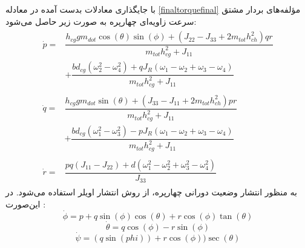 با جایگذاری معادلات بدست آمده در معادله
\ref{finaltorquefinal}
مؤلفه‌های بردار مشتق سرعت زاویه‌ای چهارپره به صورت زیر حاصل می‌شود:
\begin{align}
	\begin{split}
		\dot{p} =& \dfrac{h_{cg}gm_{dot}\cos(\theta)\sin(\phi)
			+\left(J_{22} - J_{33} +2m_{tot}h_{ch}^2\right)qr
		}
		{m_{tot}h_{cg}^2 + J_{11}} \\
		&+\dfrac{bd_{cg}\left(\omega_2^2-\omega_4^2\right) + qJ_R(\omega_1-\omega_2+\omega_3-\omega_4)}
		{m_{tot}h_{cg}^2 + J_{11}}
	\end{split}\\[1em]
		\begin{split}
		\dot{q} =& \dfrac{h_{cg}gm_{dot}\sin(\theta)
			+\left(J_{33} - J_{11} +2m_{tot}h_{ch}^2\right)pr
		}
		{m_{tot}h_{cg}^2 + J_{11}} \\
		&+\dfrac{bd_{cg}\left(\omega_1^2-\omega_3^2\right) - pJ_R(\omega_1-\omega_2+\omega_3-\omega_4)}
		{m_{tot}h_{cg}^2 + J_{11}}
	\end{split}\\[1em]
	\begin{split}
		\dot{r} =& \dfrac{pq(J_{11}-J_{22})
		+ d(\omega_1^2-\omega_2^2+\omega_3^2-\omega_4^2)
	}{J_{33}}
	\end{split}
\end{align}
به منظور انتشار وضعیت دورانی چهارپره، از روش انتشار اویلر استفاده می‌شود. در این‌صورت
\cite{zipfel2000modeling}
:
$$\dot\phi = p + q\sin(\phi)\cos(\theta) +‌
r\cos(\phi)\tan(\theta)
$$
$$
\dot \theta = q\cos(\phi) - r\sin(\phi)
$$
$$
\dot\psi = (q\sin(phi)) + r\cos(\phi))\sec(\theta) 
$$

